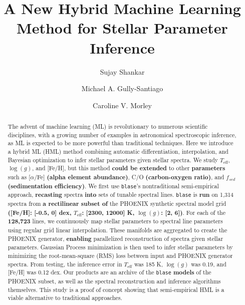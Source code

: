 \documentclass[twocolumn, linenumbers]{aastex631}
\begin{document}
\title{A New Hybrid Machine Learning Method for Stellar Parameter Inference}
\author[0000-0002-2290-6810]{Sujay Shankar}
\author[0000-0002-4020-3457]{Michael A. Gully-Santiago}
\author[0000-0002-4404-0456]{Caroline V. Morley}


\begin{abstract}
    The advent of machine learning (ML) is revolutionary to numerous scientific disciplines, with a growing number of examples in astronomical spectroscopic inference, as ML is expected to be more powerful than traditional techniques.
    Here we introduce a hybrid ML (HML) method combin{ing} automatic differentiation, interpolation, and Bayesian optimization to infer stellar parameters given stellar spectra.
    We study $T_{\mathrm{eff}}$, $\log(g)$, and [Fe/H], but this method \textbf{could be extended} to other \textbf{parameters} such as [$\alpha$/Fe] \textbf{(alpha element abundance)}, C/O \textbf{(carbon-oxygen ratio)}, and $f_{sed}$ \textbf{(sedimentation efficiency)}.
    We first use \texttt{blase}'s nontraditional semi-empirical approach, \textbf{recasting} spectra \textbf{into} sets of tunable spectral lines.
    \texttt{blase} is \textbf{run} on 1,314 spectra from \textbf{a rectilinear subset of} the PHOENIX synthetic spectral model grid \textbf{([Fe/H]: [-0.5, 0] dex, $T_\text{eff}$: [2300, 12000] K, $\log(g)$: [2, 6])}.
    For each of the \textbf{128,723} lines, we continuously map stellar parameters to spectral line parameters using regular grid linear interpolation.
    These manifolds are aggregated to create the PHOENIX generator, \textbf{enabling} parallelized reconstruction of spectra given stellar parameters.
    Gaussian Process minimization is then used to infer stellar parameters by minimizing the root-mean-square (RMS) loss between input and PHOENIX generator spectra.
    From testing, the inference error in $T_{\mathrm{eff}}$ was 185 K, $\log(g)$ was 0.19, and [Fe/H] was 0.12 dex.
    Our products are an archive of the \texttt{blase} \textbf{models} of the PHOENIX subset, as well as the spectral reconstruction and inference algorithms themselves.
    This study is a proof of concept showing that semi-empirical HML is a viable alternative to traditional approaches.
\end{abstract}
\end{document}
